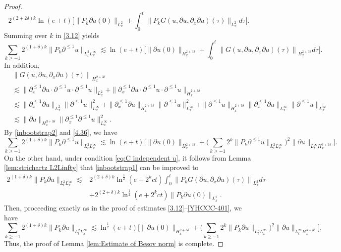 \documentclass[11pt,twoside]{article}
\def\f{\frac}
\def\p{\partial}
\def\ls{\lesssim}
\theoremstyle{plain}
\theoremstyle{definition}
\numberwithin{equation}{section}
\begin{document}
\begin{proof}
\begin{equation}
		2^{(2+2\delta) k}\ln(e+t)\big[\|P_k\p u(0)\|_{L^2_x}+
		\int_{0}^{t}\big\| P_k G(u,\p u,\p_x\p u)(\tau)\big\|_{L^2_x}d\tau\big].
	\end{equation}
Summing over $k$ in \eqref{3.12} yields
	\begin{equation}\label{inbootstrap2}
	\sum_{k\ge -1}2^{(1+\delta) k}\|P_k\p^{\le1} u\|_{L^{2}_tL^\infty_x}
	\ls \ln(e+t)
	\big[\|\p u(0)\|_{H_x^{2+3\delta}}
	+\int_{0}^{t}\left\|G(u,\p u,\p_x\p u)(\tau)\right\|_{H_x^{2+3\delta}}d\tau\big].
	\end{equation}
In addition,
	\begin{equation}\label{4.36}
		\begin{aligned}
			&\left\|G(u,\p u,\p_x\p u)(\tau)\right\|_{H_x^{2+3\delta}}\\
			&\ls
			\|\p_x^{\le 1}\p u\cdot\p^{\le 1} u\cdot\p^{\le 1} u\|_{L_x^2}
			+
			\|\p_x^{\le 1}\p u\cdot\p^{\le 1} u\cdot\p^{\le 1} u\|_{\dot{H}_x^{2+3\delta}}\\
			&\ls
			\|\p_x^{\le 1}\p u\|_{L_x^2} \|\p^{\le 1} u\|_{L_x^\infty}^2
			+
			\|\p_x^{\le 1}\p u\|_{\dot{H}_x^{2+3\delta}} \|\p^{\le 1} u\|_{L_x^\infty}^2
			+
			\|\p^{\le 1} u\|_{\dot{H}_x^{2+3\delta}} \|\p_x^{\le 1}\p u\|_{L_x^\infty}\|\p^{\le 1} u\|_{L_x^\infty}\\
			&\ls
			\|\p u\|_{{H}_x^{3+3\delta}} \|\p_x^{\le 1}\p^{\le 1} u\|_{L_x^\infty}^2.		
		\end{aligned}
	\end{equation}
	By \eqref{inbootstrap2} and \eqref{4.36}, we have
	\begin{equation}\label{YHCCC-401}
		\sum_{k\ge -1}2^{(1+\delta) k}\|P_k\p^{\le1} u\|_{L^{2}_tL^\infty_x}
		\ls \ln(e+t)
		\big[\|\p u(0)\|_{H_x^{2+3\delta}}
		+\big(\sum_{k \geq -1}2^k\|P_k\p^{\le1} u\|_{L^2_tL^\infty_x}\big)^2\|\p u\|_{L^\infty_t H_x^{3+3\delta}}\big].
	\end{equation}
	On the other hand, under condition \eqref{eq:C independent u}, it follows from
Lemma \ref{lem:strichartz L2Linfty} that \eqref{inbootstrap1} can be improved to
	\begin{equation}
		\begin{split}
			2^{(1+\delta) k}\|P_k\p u\|_{L^{2}_tL^\infty_x}
			\ls
			&2^{(2+\delta) k}\ln^{\f12}(e+2^k ct)
			\int_{0}^{t}\left\| P_k  G(\p u,\p_x\p u)(\tau)\right\|_{L^2_x}d\tau\\
			&+2^{(2+\delta) k}\ln^{\f12}(e+2^k ct)\|P_k\p u(0)\|_{L^2_x}.
		\end{split}
	\end{equation}
	Then, proceeding exactly as in the proof of estimates \eqref{3.12}--\eqref{YHCCC-401}, we have
	\begin{equation*}
		\sum_{k\ge -1}2^{(1+\delta) k}\|P_k\p u\|_{L^{2}_tL^\infty_x}
		\ls \ln^{\f12}(e+t)
		\big[\|\p u(0)\|_{H_x^{2+3\delta}}
		+\big(\sum_{k \geq -1}2^k\|P_k\p u\|_{L^2_tL^\infty_x}\big)^2\|\p u\|_{L^\infty_t H_x^{3+3\delta}}\big].
	\end{equation*}
	Thus, the proof of Lemma \ref{lem:Estimate of Besov norm} is complete.
\end{proof}	
\end{document}
